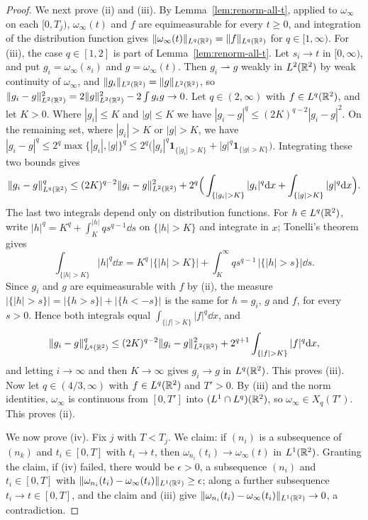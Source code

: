 \begin{proof}
We next prove (ii) and (iii). By Lemma~\ref{lem:renorm-all-t}, applied to
$\omega_\infty$ on each $[0,T_j)$, $\omega_\infty(t)$ and $f$ are equimeasurable
for every $t\ge0$, and integration of the distribution function gives
$\|\omega_\infty(t)\|_{L^q(\mathbb{R}^2)}=\|f\|_{L^q(\mathbb{R}^2)}$ for $q\in[1,\infty)$. For (iii), the
case $q\in[1,2]$ is part of Lemma~\ref{lem:renorm-all-t}. Let $s_i\to t$ in
$[0,\infty)$, and put $g_i=\omega_\infty(s_i)$ and $g=\omega_\infty(t)$. Then
$g_i\rightharpoonup g$ weakly in $L^2(\mathbb{R}^2)$ by weak continuity of $\omega_\infty$, and $\|g_i\|_{L^2(\mathbb{R}^2)}=\|g\|_{L^2(\mathbb{R}^2)}$, so
$\|g_i-g\|_{L^2(\mathbb{R}^2)}^2=2\|g\|_{L^2(\mathbb{R}^2)}^2-2\int g_ig\to0$. Let $q\in(2,\infty)$ with
$f\in L^q(\mathbb{R}^2)$, and let $K>0$. Where $|g_i|\le K$ and $|g|\le K$ we have
$|g_i-g|^q\le(2K)^{q-2}|g_i-g|^2$. On the remaining set, where $|g_i|>K$ or
$|g|>K$, we have
$|g_i-g|^q\le2^q\max\{|g_i|,|g|\}^q\le2^q\big(|g_i|^q\mathbf 1_{\{|g_i|>K\}}+|g|^q\mathbf 1_{\{|g|>K\}}\big)$.
Integrating these two bounds gives
\[
\|g_i-g\|_{L^q(\R^2)}^q\le(2K)^{q-2}\|g_i-g\|_{L^2(\R^2)}^2
+2^q\Big(\int_{\{|g_i|>K\}}|g_i|^q\dd x+\int_{\{|g|>K\}}|g|^q\dd x\Big).
\]
The last two integrals depend only on distribution functions. For $h\in L^q(\mathbb{R}^2)$,
write $|h|^q=K^q+\int_K^{|h|}qs^{q-1}\dd s$ on $\{|h|>K\}$ and integrate in $x$;
Tonelli's theorem gives
\[
\int_{\{|h|>K\}}|h|^q\dd x=K^q\,|\{|h|>K\}|+\int_K^\infty qs^{q-1}\,|\{|h|>s\}|\dd s .
\]
Since $g_i$ and $g$ are equimeasurable with $f$ by (ii), the measure
$|\{|h|>s\}|=|\{h>s\}|+|\{h<-s\}|$ is the same for $h=g_i$, $g$ and $f$, for
every $s>0$. Hence both integrals equal $\int_{\{|f|>K\}}|f|^q\dd x$, and
\[
\|g_i-g\|_{L^q(\R^2)}^q\le(2K)^{q-2}\|g_i-g\|_{L^2(\R^2)}^2+2^{q+1}\int_{\{|f|>K\}}|f|^q\dd x ,
\]
and letting $i\to\infty$ and then $K\to\infty$ gives $g_i\to g$ in $L^q(\mathbb{R}^2)$.
This proves (iii). Now let
$q\in(4/3,\infty)$ with $f\in L^q(\mathbb{R}^2)$ and $T'>0$. By (iii) and the norm
identities, $\omega_\infty$ is continuous from $[0,T']$ into $(L^1\cap L^q)(\mathbb{R}^2)$, so
$\omega_\infty\in X_q(T')$. This proves (ii).

We now prove (iv). Fix $j$ with $T<T_j$. We claim: if $(n_i)$ is
a subsequence of $(n_k)$ and $t_i\in[0,T]$ with $t_i\to t$, then
$\omega_{n_i}(t_i)\to\omega_\infty(t)$ in $L^1(\mathbb{R}^2)$. Granting the
claim, if (iv) failed, there would be $\epsilon>0$, a
subsequence $(n_i)$ and $t_i\in[0,T]$ with
$\|\omega_{n_i}(t_i)-\omega_\infty(t_i)\|_{L^1(\mathbb{R}^2)}\ge\epsilon$; along a further
subsequence $t_i\to t\in[0,T]$, and the claim and (iii) give
$\|\omega_{n_i}(t_i)-\omega_\infty(t_i)\|_{L^1(\mathbb{R}^2)}\to0$, a contradiction.


\end{proof}
